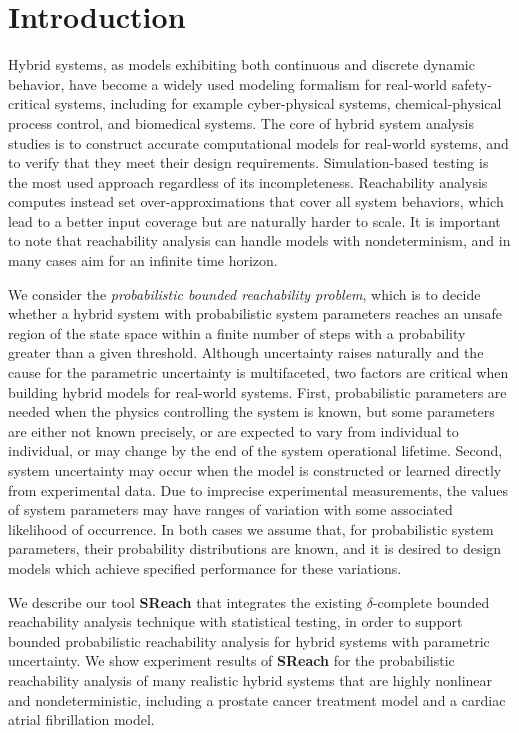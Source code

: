 \section{Introduction} 
\vspace{-.2cm} 
Hybrid systems, as models exhibiting both continuous and discrete dynamic behavior, have become 
a widely used modeling formalism for real-world safety-critical systems,
including for example cyber-physical systems, chemical-physical process control, and biomedical systems. 
The core of hybrid system analysis studies is to construct accurate computational models for real-world systems, 
and to verify that they meet their design requirements. Simulation-based testing 
is the most used approach regardless of its incompleteness. Reachability analysis computes instead set over-approximations that
cover all system behaviors, which lead to a better input coverage but are naturally harder to scale.
It is important to note that reachability analysis can handle models with nondeterminism, and in many cases aim for an infinite time horizon.

We consider the {\em probabilistic bounded reachability problem}, which is to decide whether
a hybrid system with probabilistic system parameters reaches an unsafe region of the
state space within a finite number of steps with a probability greater than a given threshold.
Although uncertainty raises naturally and the cause for the parametric uncertainty is multifaceted, two factors 
are critical when building hybrid models for real-world systems. 
First, probabilistic parameters are needed when the physics controlling the system is known, but some 
parameters are either not known precisely, or are expected to vary from individual to individual, 
or may change by the end of the system operational lifetime. 
Second, system uncertainty may occur when the model is constructed or learned directly from experimental data. 
Due to imprecise experimental measurements, the values of system parameters may have ranges of variation 
with some associated likelihood of occurrence. 
In both cases we assume that, for probabilistic system parameters, their probability distributions
are known, and it is desired to design models which achieve specified performance for these variations.   

We describe our tool {\bf SReach} that integrates the existing $\delta$-complete bounded 
reachability analysis technique \cite{gaodelta} with statistical testing, in order
to support bounded probabilistic reachability analysis for hybrid systems with parametric uncertainty. 
We show experiment results of {\bf SReach} for the probabilistic reachability analysis of many realistic hybrid systems that are highly nonlinear and nondeterministic, including a prostate cancer treatment model and a
cardiac atrial fibrillation model. 

